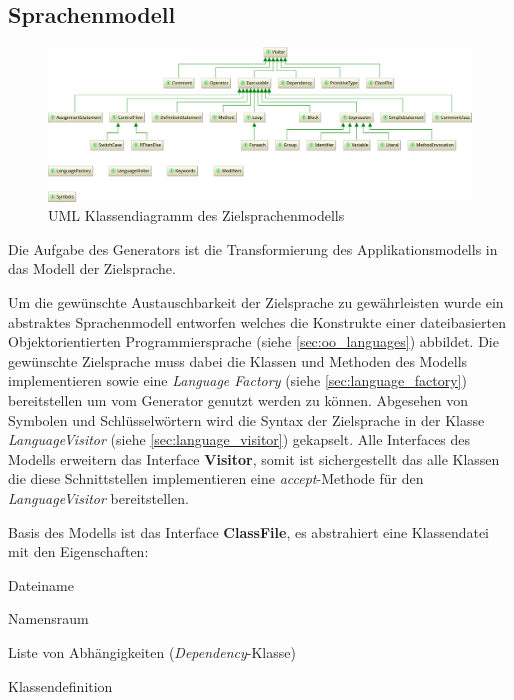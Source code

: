 \subsection{Sprachenmodell}
\label{sec:language_model}

\begin{figure}
    \centering
    \includegraphics[width=\textwidth]{resources/languagemodel_common}
    \caption{UML Klassendiagramm des Zielsprachenmodells}
    \label{fig:language_model}
\end{figure}

Die Aufgabe des Generators ist die Transformierung des Applikationsmodells in das Modell der Zielsprache. 

Um die gewünschte Austauschbarkeit der Zielsprache zu gewährleisten wurde ein abstraktes Sprachenmodell entworfen welches die Konstrukte einer dateibasierten Objektorientierten Programmiersprache (siehe \cref{sec:oo_languages}) abbildet. 
Die gewünschte Zielsprache muss dabei die Klassen und Methoden des Modells implementieren sowie eine \emph{Language Factory} (siehe \cref{sec:language_factory}) bereitstellen um vom Generator genutzt werden zu können.
Abgesehen von Symbolen und Schlüsselwörtern wird die Syntax der Zielsprache in der Klasse \emph{LanguageVisitor} (siehe \cref{sec:language_visitor}) gekapselt. 
Alle Interfaces des Modells erweitern das Interface \textbf{Visitor}, somit ist sichergestellt das alle Klassen die diese Schnittstellen implementieren eine \emph{accept}-Methode für den \emph{LanguageVisitor} bereitstellen.

Basis des Modells ist das Interface \textbf{ClassFile}, es abstrahiert eine Klassendatei mit den Eigenschaften:
\begin{compactitem}
    \item Dateiname
    \item Namensraum
    \item Liste von Abhängigkeiten (\emph{Dependency}-Klasse)
    \item Klassendefinition
\end{compactitem}

